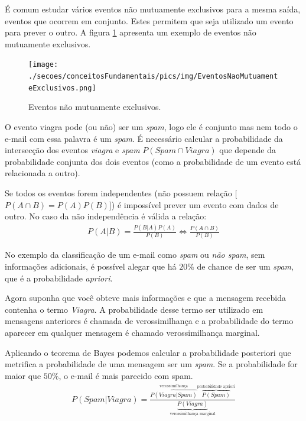 É comum estudar vários eventos não mutuamente exclusivos para a mesma saída, eventos que ocorrem em conjunto. Estes permitem que seja utilizado um evento para prever o outro. A figura \ref{FIGURA_EVENTOS_NAO_MUTUAMENTE_EXCLUSIVOS} apresenta um exemplo de eventos não mutuamente exclusivos.
\begin{figure}[hbt]
	\centering
 	  \caption{Eventos não mutuamente exclusivos.}
		\texttt{[image: ./secoes/conceitosFundamentais/pics/img/EventosNaoMutuamenteExclusivos.png]}
	\label{FIGURA_EVENTOS_NAO_MUTUAMENTE_EXCLUSIVOS}
\end{figure}
O evento viagra pode (ou não) ser um \emph{spam}, logo ele é conjunto mas nem todo o e-mail com essa palavra é um \emph{spam}. É necessário calcular a probabilidade da intersecção dos eventos \emph{viagra} e \emph{spam} \(P(Spam \cap Viagra)\) que depende da probabilidade conjunta dos dois eventos (como a probabilidade de um evento está relacionada a outro).

Se todos os eventos forem independentes (não possuem relação [\(P(A \cap B) = P(A)P(B)\)]) é impossível prever um evento com dados de outro. No caso da não independência é válida a relação:
\begin{align}
P(A|B) =  \frac{P(B|A)P(A)}{P(B)} \Leftrightarrow \frac{P(A \cap B)}{P(B)} \label{BAYES}
\end{align}

No exemplo da classificação de um e-mail como \emph{spam} ou \emph{não spam}, sem informações adicionais, é possível alegar que há \(20\%\) de chance de ser um \emph{spam}, que é a probabilidade \emph{apriori}.

Agora suponha que você obteve mais informações e que a mensagem recebida contenha o termo \emph{Viagra}. A probabilidade desse termo ser utilizado em mensagens anteriores é chamada de verossimilhança e a probabilidade do termo aparecer em qualquer mensagem é chamado verossimilhança marginal.

Aplicando o teorema de Bayes podemos calcular a probabilidade posteriori que metrifica a probabilidade de uma mensagem ser um \emph{spam}. Se a probabilidade for maior que \(50\%\), o e-mail é mais parecido com spam.
\begin{align}
P(Spam|Viagra) =  \frac{\overbrace{P(Viagra|Spam)}^{\text{verossimilhança}} \overbrace{P(Spam)}^{\text{probabilidade apriori}}}{\underbrace{P(Viagra)}_{\text{verossimilhança marginal}}}
\end{align}

